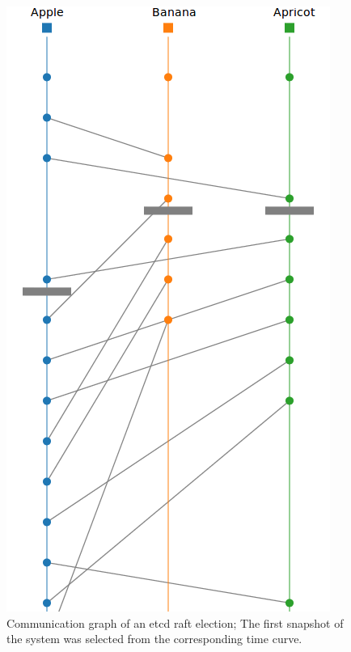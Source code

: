\begin{figure}[h]
    \includegraphics[width=\linewidth]{fig/communication-graph}%
    \caption{Communication graph of an etcd raft election; The first snapshot of the system was selected from the corresponding time curve.\label{fig:communication-graph}}%
\end{figure}


